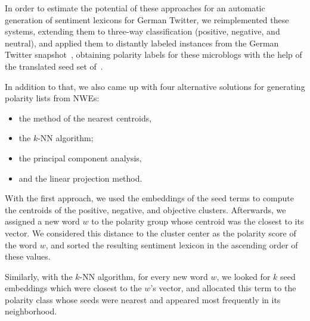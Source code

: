 In order to estimate the potential of these approaches for an
automatic generation of sentiment lexicons for German Twitter, we
reimplemented these systems, extending them to three-way
classification (positive, negative, and neutral), and applied them to
distantly labeled instances from the German Twitter
snapshot~\cite{Scheffler:14}, obtaining polarity labels for these
microblogs with the help of the translated seed set
of~\citet{Turney:03}.

In addition to that, we also came up with four alternative solutions
for generating polarity lists from NWEs:
\begin{itemize}
\item the method of the nearest centroids,
\item the $k$-NN algorithm;
\item the principal component analysis,
\item and the linear projection method.
\end{itemize}

With the first approach, we used the embeddings of the seed terms to
compute the centroids of the positive, negative, and objective
clusters.  Afterwards, we assigned a new word $w$ to the polarity
group whose centroid was the closest to its vector.  We considered
this distance to the cluster center as the polarity score of the word
$w$, and sorted the resulting sentiment lexicon in the ascending order
of these values.

Similarly, with the $k$-NN algorithm, for every new word $w$, we
looked for $k$ seed embeddings which were closest to the $w$'s vector,
and allocated this term to the polarity class whose seeds were nearest
and appeared most frequently in its neighborhood.

